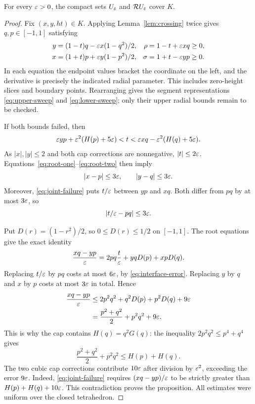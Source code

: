 \begin{proposition}\label{prop:coverage}
For every $\varepsilon>0$, the compact sets $U_\varepsilon$ and
$\mathcal R U_\varepsilon$ cover $K$.
\end{proposition}
\begin{proof}
Fix $(x,y,ht)\in K$. Applying Lemma~\ref{lem:crossing} twice
gives $q,p\in[-1,1]$ satisfying
\begin{align}
 y&=(1-t)q-\varepsilon x(1-q^2)/2,
 &\rho&=1-t+\varepsilon xq\ge0,\label{eq:root-one}\\
 x&=(1+t)p+\varepsilon y(1-p^2)/2,
 &\sigma&=1+t-\varepsilon yp\ge0.\label{eq:root-two}
\end{align}
In each equation the endpoint values bracket the coordinate on
the left, and the derivative is precisely the indicated radial
parameter. This includes zero-height slices and boundary points.
Rearranging gives the segment representations
\eqref{eq:upper-sweep} and \eqref{eq:lower-sweep}; only their
upper radial bounds remain to be checked.

If both bounds failed, then
\begin{equation}\label{eq:joint-failure}
 \varepsilon yp+\varepsilon^2(H(p)+5\varepsilon)<t
       <\varepsilon xq-\varepsilon^2(H(q)+5\varepsilon).
\end{equation}
As $|x|,|y|\le2$ and both cap corrections are nonnegative,
$|t|\le2\varepsilon$. Equations~\eqref{eq:root-one}--\eqref{eq:root-two}
then imply
\[
 |x-p|\le3\varepsilon,\qquad |y-q|\le3\varepsilon.
\]
Moreover, \eqref{eq:joint-failure} puts $t/\varepsilon$ between
$yp$ and $xq$. Both differ from $pq$ by at most $3\varepsilon$, so
\begin{equation}\label{eq:interface-error}
 |t/\varepsilon-pq|\le3\varepsilon.
\end{equation}

Put $D(r)=(1-r^2)/2$, so $0\le D(r)\le1/2$ on $[-1,1]$.
The root equations give the exact identity
\[
 \frac{xq-yp}{\varepsilon}
   =2pq\frac t{\varepsilon}+yqD(p)+xpD(q).
\]
Replacing $t/\varepsilon$ by $pq$ costs at most $6\varepsilon$, by
\eqref{eq:interface-error}. Replacing $y$ by $q$ and $x$ by
$p$ costs at most $3\varepsilon$ in total. Hence
\begin{align*}
 \frac{xq-yp}{\varepsilon}
 &\le2p^2q^2+q^2D(p)+p^2D(q)+9\varepsilon\\
 &=\frac{p^2+q^2}{2}+p^2q^2+9\varepsilon.
\end{align*}
This is why the cap contains $H(q)=q^2G(q)$: the inequality
$2p^2q^2\le p^4+q^4$ gives
\[
 \frac{p^2+q^2}{2}+p^2q^2\le H(p)+H(q).
\]
The two cubic cap corrections contribute $10\varepsilon$ after division
by $\varepsilon^2$, exceeding the error $9\varepsilon$.
Indeed, \eqref{eq:joint-failure} requires $(xq-yp)/\varepsilon$ to be
strictly greater than $H(p)+H(q)+10\varepsilon$. This contradiction
proves the proposition. All estimates were uniform over the closed
tetrahedron.
\end{proof}

